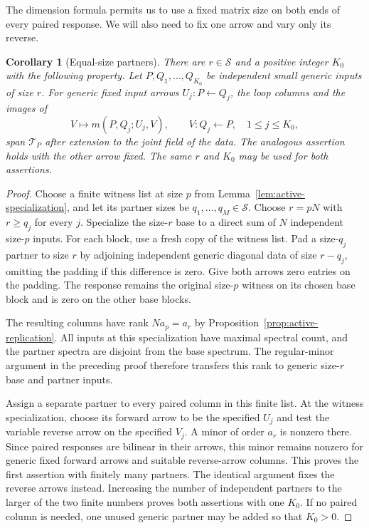 \documentclass[11pt]{article}
\newtheorem{corollary}[theorem]{Corollary}
\theoremstyle{definition}
\theoremstyle{remark}
\numberwithin{equation}{section}
\begin{document}
The dimension formula permits us to use a fixed matrix size on both
ends of every paired response.  We will also need to fix one arrow
and vary only its reverse.

\begin{corollary}[Equal-size partners]
\label{cor:equal-size-partners}
There are $r\in\mathcal S$ and a positive integer $K_0$ with the
following property.  Let $P,Q_1,\ldots,Q_{K_0}$ be independent small
generic inputs of size $r$.  For generic fixed input arrows
$U_j:P\leftarrow Q_j$, the loop columns and the images of
\[
 V\longmapsto m(P,Q_j;U_j,V),
 \qquad V:Q_j\leftarrow P,\quad 1\leq j\leq K_0,
\]
span $\mathcal T_P$ after extension to the joint field of the data.
The analogous assertion holds with the other arrow fixed.  The same
$r$ and $K_0$ may be used for both assertions.
\end{corollary}

\begin{proof}
Choose a finite witness list at size $p$ from
Lemma~\ref{lem:active-specialization}, and let its partner sizes be
$q_1,\ldots,q_M\in\mathcal S$.  Choose $r=pN$ with
$r\geq q_j$ for every $j$.  Specialize the size-$r$ base to a direct
sum of $N$ independent size-$p$ inputs.  For each block, use a fresh
copy of the witness list.  Pad a size-$q_j$ partner to size $r$ by
adjoining independent generic diagonal data of size $r-q_j$, omitting
the padding if this difference is zero.  Give both arrows zero entries
on the padding.  The response remains the original size-$p$ witness
on its chosen base block and is zero on the other base blocks.

The resulting columns have rank $Na_p=a_r$ by
Proposition~\ref{prop:active-replication}.  All inputs at this
specialization have maximal spectral count, and the partner spectra
are disjoint from the base spectrum.  The regular-minor argument in
the preceding proof therefore transfers this rank to generic
size-$r$ base and partner inputs.

Assign a separate partner to every paired column in this finite
list.  At the witness specialization, choose its forward arrow to
be the specified $U_j$ and test the variable reverse arrow on the
specified $V_j$.  A minor of order $a_r$ is nonzero there.  Since
paired responses are bilinear in their arrows, this minor remains
nonzero for generic fixed forward arrows and suitable reverse-arrow
columns.  This proves the first assertion with finitely many partners.
The identical argument fixes the reverse arrows instead.  Increasing
the number of independent partners to the larger of the two finite
numbers proves both assertions with one $K_0$.  If no paired column
is needed, one unused generic partner may be added so that $K_0>0$.
\end{proof}
\end{document}
